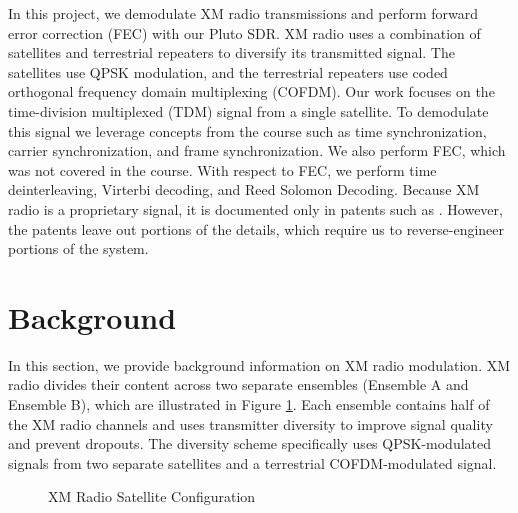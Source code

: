 \documentclass[conference,onecolumn]{IEEEtran}
\begin{document}
In this project, we demodulate XM radio transmissions and perform forward error correction (FEC) with our Pluto SDR. XM radio uses a combination of satellites and terrestrial repeaters to diversify its transmitted signal. The satellites use QPSK modulation, and the terrestrial repeaters use coded orthogonal frequency domain multiplexing (COFDM). Our work focuses on the time-division multiplexed (TDM) signal from a single satellite. To demodulate this signal we leverage concepts from the course such as time synchronization, carrier synchronization, and frame synchronization. We also perform FEC, which was not covered in the course. With respect to FEC, we perform time deinterleaving, Virterbi decoding, and Reed Solomon Decoding. Because XM radio is a proprietary signal, it is documented only in patents such as \cite{a2008_us8260192b2, marko_2012_us8667344b2}. However, the patents leave out portions of the details, which require us to reverse-engineer portions of the system.

\section{Background}

In this section, we provide background information on XM radio modulation. XM radio divides their content across two separate ensembles (Ensemble A and Ensemble B), which are illustrated in Figure \ref{fig::xm_satellite_config}. Each ensemble contains half of the XM radio channels and uses transmitter diversity to improve signal quality and prevent dropouts. The diversity scheme specifically uses QPSK-modulated signals from two separate satellites and a terrestrial COFDM-modulated signal.

\begin{figure}[H]
	\centerline{}
	\caption{XM Radio Satellite Configuration \cite{5586866}}
	\label{fig::xm_satellite_config}
\end{figure}
\end{document}
